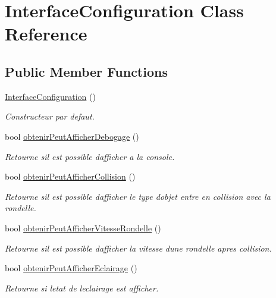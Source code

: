 \hypertarget{class_interface_configuration}{}\section{Interface\+Configuration Class Reference}
\label{class_interface_configuration}
\subsection*{Public Member Functions}
\begin{DoxyCompactItemize}
\item 
\hyperlink{group__inf2990_ga0f610f6a1fb2877f56c88bfdb32b7232}{Interface\+Configuration} ()
\begin{DoxyCompactList}\small\item\em Constructeur par defaut. \end{DoxyCompactList}\item 
bool \hyperlink{group__inf2990_gad2f726db7e0b3a79737abf30f19cfd71}{obtenir\+Peut\+Afficher\+Debogage} ()
\begin{DoxyCompactList}\small\item\em Retourne s\textquotesingle{}il est possible d\textquotesingle{}afficher a la console. \end{DoxyCompactList}\item 
bool \hyperlink{group__inf2990_ga64d970ca095f3721a1a47e2da00fa3f8}{obtenir\+Peut\+Afficher\+Collision} ()
\begin{DoxyCompactList}\small\item\em Retourne s\textquotesingle{}il est possible d\textquotesingle{}afficher le type d\textquotesingle{}objet entre en collision avec la rondelle. \end{DoxyCompactList}\item 
bool \hyperlink{group__inf2990_ga8dc2c7833c29e8b3162bfdef96a6437d}{obtenir\+Peut\+Afficher\+Vitesse\+Rondelle} ()
\begin{DoxyCompactList}\small\item\em Retourne s\textquotesingle{}il est possible d\textquotesingle{}afficher la vitesse d\textquotesingle{}une rondelle apres collision. \end{DoxyCompactList}\item 
bool \hyperlink{group__inf2990_ga64fc6c1c5b78045184a79888a0eea801}{obtenir\+Peut\+Afficher\+Eclairage} ()
\begin{DoxyCompactList}\small\item\em Retourne si l\textquotesingle{}etat de l\textquotesingle{}eclairage est afficher. \end{DoxyCompactList}\item 

\end{DoxyCompactItemize}
